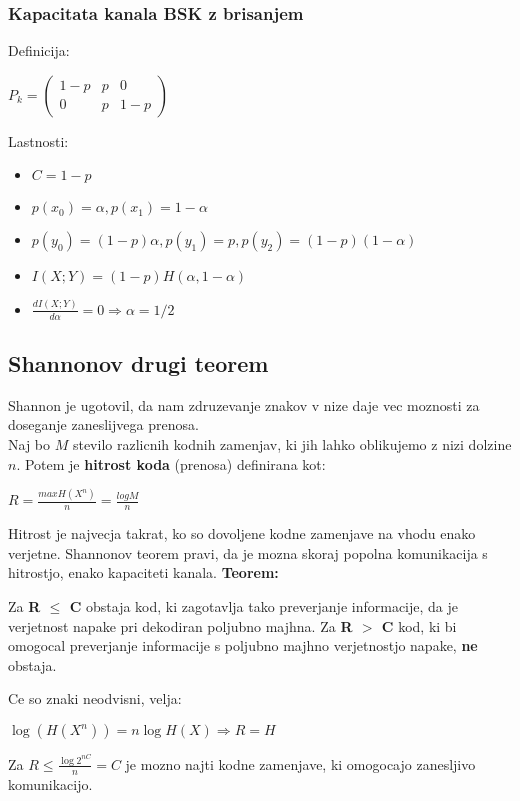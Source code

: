 \documentclass{article}
\begin{document}
\begin{multicols}{3}
\subsubsection{Kapacitata kanala BSK z brisanjem}
Definicija:
\begin{center}
    \begin{math}
        P_k = 
                \begin{pmatrix}
                    1-p & p & 0\\
                    0   & p & 1-p
                \end{pmatrix}
    \end{math}
\end{center}
Lastnosti:
\begin{itemize}
    \item $C = 1 - p$
    \item $p(x_0) = \alpha, p(x_1) = 1 - \alpha$
    \item $p(y_0) = (1-p)\alpha, p(y_1) = p, p(y_2) = (1-p)(1-\alpha)$
    \item $I(X;Y) = (1-p)H(\alpha, 1 - \alpha)$
    \item $\frac{dI(X;Y)}{d \alpha} = 0 \Rightarrow \alpha = 1/2$
\end{itemize}

\subsection{Shannonov drugi teorem}
Shannon je ugotovil, da nam zdruzevanje znakov v nize daje vec moznosti za doseganje zaneslijvega prenosa.\\
Naj bo $M$ stevilo razlicnih kodnih zamenjav, ki jih lahko oblikujemo z nizi dolzine $n$. Potem je \textbf{hitrost koda}
(prenosa)  definirana kot:
\begin{center}
    \begin{math}
        R = \frac{max H(X^n)}{n} = \frac{log M}{n}
    \end{math}
\end{center}
Hitrost je najvecja takrat, ko so dovoljene kodne zamenjave na vhodu enako verjetne. Shannonov teorem pravi, da je mozna
skoraj popolna komunikacija s hitrostjo, enako kapaciteti kanala.
\textbf{Teorem:}\\
\begin{center}
    Za \textbf{R $\leq$ C} obstaja kod, ki zagotavlja tako preverjanje informacije, da je verjetnost napake pri
    dekodiran  poljubno majhna. Za \textbf{R $>$ C} kod, ki bi omogocal preverjanje informacije s poljubno majhno
    verjetnostjo napake, \textbf{ne} obstaja.
\end{center}
Ce so znaki neodvisni, velja:
\begin{center}
    \begin{math}
        \log(H(X^n)) = n \log H(X) \Rightarrow R = H
    \end{math}
\end{center}
Za $R \leq \frac{\log 2^{nC}}{n} = C$ je mozno najti kodne zamenjave, ki omogocajo zanesljivo komunikacijo.


\end{multicols}
\end{document}
